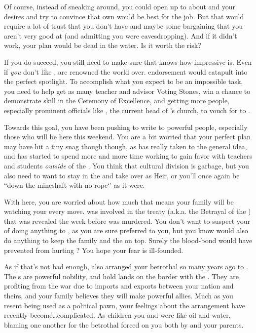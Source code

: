 \documentclass[char]{GL2020}
\begin{document}
Of course, instead of sneaking around, you could open up to \cDiplomat{} about \cAmbition{} and your desires and try to convince \cDiplomat{\them} that \cDiplomat{\their} own \cAmbition{\offspring} would be best for the job. But that would require a lot of trust that you don’t have and maybe some bargaining that you aren’t very good at (and admitting you were eavesdropping). And if it didn’t work, your plan would be dead in the water. Is it worth the risk? 

If you do succeed, you still need to make sure that \cDiplomat{} knows how impressive \cAmbition{} is. Even if \emph{you} don’t like \cDiplomat{\them}, \cDiplomat{\they} are renowned the world over. \cDiplomat{\Their} endorsement would catapult \cAmbition{} into the perfect spotlight. To accomplish what you expect to be an impossible task, you need to help \cAmbition{\them} get as many teacher and advisor Voting Stones, win a chance to demonstrate \cAmbition{\their} skill in the Ceremony of Excellence, and getting more people, especially prominent \pTech{} officials like \cAntiChup{\full}, the current head of \cTechGod{}’s church, to vouch for \cAmbition{\them} to \cDiplomat{}. 

Towards this goal, you have been pushing \cAmbition{} to write to powerful people, especially those who will be here this weekend. You are a bit worried that your perfect plan may have hit a tiny snag though though, as \cAmbition{} has really taken to the general idea, and has started to spend more and more time working to gain favor with teachers and students \emph{outside} of the \pTech{}. You think that cultural division is garbage, but you also need \cAmbition{\them} to want to stay in the \pTech{} and take over as Heir, or you’ll once again be ``down the mineshaft with no rope‘’ as it were.    

With \cDiplomat{} here, you are worried about how much that means your family will be watching your every move. \cDiplomat{} was involved in the treaty (a.k.a. the Betrayal of the \pShippies{}) that was revealed the week before \cHeirSibling{} was murdered. You don’t want to suspect your \cDiplomat{\auncle} of doing anything to \cHeirSibling{}, as you are sure \cDiplomat{\they} preferred \cHeirSibling{\them} to you, but you know \cDiplomat{\they} would also do anything to keep the family and the \pTechies{} on top. Surely the blood-bond would have prevented \cDiplomat{} from hurting \cHeirSibling{}? You hope your fear is ill-founded. 

As if that's not bad enough, \cDiplomat{} also arranged your betrothal so many years ago to \cChupStudent{}. The \cChupStudent{\formal}s are powerful \pFarm{} nobility, and hold lands on the border with the \pTech{}. They are profiting from the war due to imports and exports between your nation and theirs, and your family believes they will make powerful allies. Much as you resent being used as a political pawn, your feelings about the arrangement have recently become\ldots complicated. As children you and \cChupStudent{} were like oil and water, blaming one another for the betrothal forced on you both by \cDiplomat{} and your parents.
\end{document}
